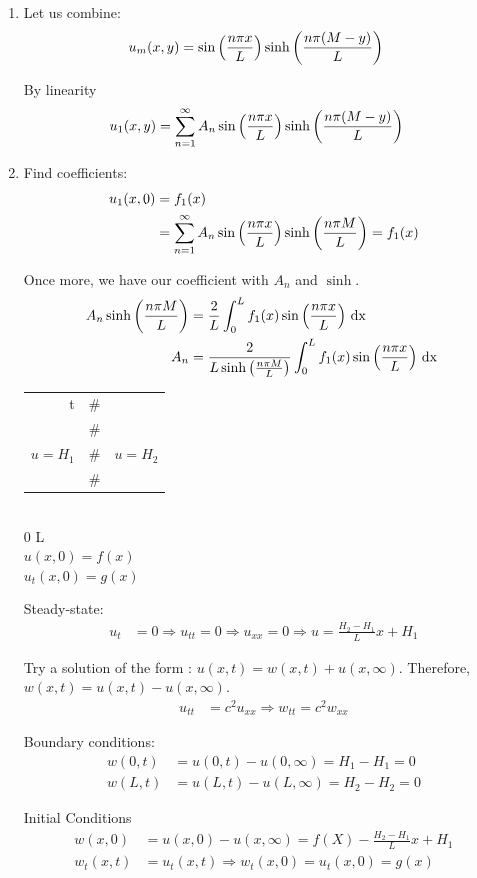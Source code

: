 \documentclass{article}
\begin{document}
\begin{enumerate}
\item Let us combine:
%
\begin{align}
  u_m(x, y) & = \sin \Big( \frac{n \pi x}{L} \Big) \sinh\left( \frac{ n \pi (M - y)}{L} \right)
\end{align}

By linearity
%
\begin{align}
  u_1(x, y) & = \sum^\infty_{n = 1} A_n \sin \Big( \frac{n \pi x}{L} \Big) \sinh\left( \frac{n \pi(M -y)}{L} \right)
\end{align}

\item Find coefficients:
%
\begin{align}
  u_1(x, 0) & = f_1(x)\\
  & = \sum^\infty_{n = 1} A_n \sin \Big( \frac{n \pi x}{L} \Big) \sinh\left( \frac{n \pi M}{L} \right) = f_1(x)
\end{align}

Once more, we have our coefficient with $A_n$ and $\sinh$.
%
\begin{align}
  A_n \sinh \left( \frac{n \pi M}{L} \right) & = \frac{2}{L} \int^L_0 f_1(x) \sin \Big( \frac{n \pi x}{L} \Big) \text{ dx }\\
  A_n & = \frac{2}{L \sinh \left( \frac{n \pi M}{L} \right)} \int^L_0 f_1(x) \sin \Big( \frac{n \pi x}{L} \Big) \text{ dx }
\end{align}


\begin{center}
  \begin{tabular}{r|c|l}
    t & \# &\\
    & \# & \\
    $u = H_1$ & \# & $u = H_2$\\
    & \# &\\
    \hline
  \end{tabular}\\
  0 \quad L\\
  $u(x, 0) = f(x)$\\
  $u_t(x, 0) = g(x)$
\end{center}

Steady-state:
%
\begin{align}
  u_t & = 0 \Rightarrow u_{tt} = 0 \Rightarrow u_{xx} = 0 \Rightarrow u = \frac{H_2 - H_1}{L} x + H_1
\end{align}

Try a solution of the form : $u(x, t) = w(x, t) + u(x, \infty)$. Therefore, $w(x, t) = u(x, t) - u(x, \infty)$.
%
\begin{align}
  u_{tt} & = c^2 u_{xx} \Rightarrow w_{tt} = c^2 w_{xx}
\end{align}

Boundary conditions:
%
\begin{align}
  w(0, t) & = u(0, t) - u(0, \infty) = H_1 - H_1 = 0\\
  w(L, t) & = u(L, t) - u(L, \infty) = H_2 - H_2 = 0
\end{align}

Initial Conditions
%
\begin{align}
  w(x, 0) & = u(x, 0) - u(x, \infty) = f(X) - \frac{H_2 - H_1}{L} x + H_1\\
  w_t(x, t) & = u_t(x, t) \Rightarrow w_t(x, 0) = u_t(x, 0) = g(x)
\end{align}
\end{enumerate}
\end{document}
